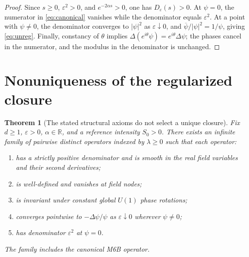 \documentclass[11pt]{article}
\newtheorem{theorem}{Theorem}[section]
\theoremstyle{remark}
\newcommand{\R}{\mathbb{R}}
\begin{document}
\begin{proof}
Since $s\geq0$, $\varepsilon^2>0$, and $e^{-2\alpha s}>0$,
one has $D_\varepsilon(s)>0$. At $\psi=0$, the numerator in
\eqref{eq:canonical} vanishes while the denominator equals
$\varepsilon^2$. At a point with $\psi\neq0$, the denominator converges
to $|\psi|^2$ as $\varepsilon\downarrow0$, and
$\overline\psi/|\psi|^2=1/\psi$, giving \eqref{eq:unreg}.
Finally, constancy of $\theta$ implies
$\Delta(e^{i\theta}\psi)=e^{i\theta}\Delta\psi$; the phases cancel in
the numerator, and the modulus in the denominator is unchanged.
\end{proof}

\section{Nonuniqueness of the regularized closure}

\begin{theorem}[The stated structural axioms do not select a unique closure]
\label{thm:closure}
Fix $d\geq1$, $\varepsilon>0$, $\alpha\in\R$, and a reference
intensity $S_0>0$. There exists an infinite family of pairwise distinct
operators indexed by $\lambda\geq0$ such that each operator:
\begin{enumerate}
\item has a strictly positive denominator and is smooth in the real
      field variables and their second derivatives;
\item is well-defined and vanishes at field nodes;
\item is invariant under constant global $U(1)$ phase rotations;
\item converges pointwise to $-\Delta\psi/\psi$ as
      $\varepsilon\downarrow0$ wherever $\psi\neq0$;
\item has denominator $\varepsilon^2$ at $\psi=0$.
\end{enumerate}
The family includes the canonical M6B operator.
\end{theorem}
\end{document}
